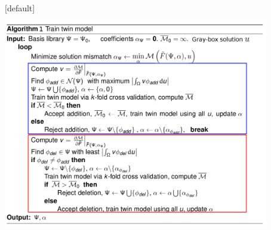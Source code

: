 \documentclass{beamer}
\begin{document}
\setcounter{framenumber}{22}
{
\makeatletter
{}[default] 
\def\beamer@entrycode{\vspace*{-\headheight}} 
\makeatother
\begin{frame}
    \begin{center}
        \includegraphics[height=9cm]{algo2.png}
    \end{center}
\end{frame}
}
%
%
%
\end{document}
